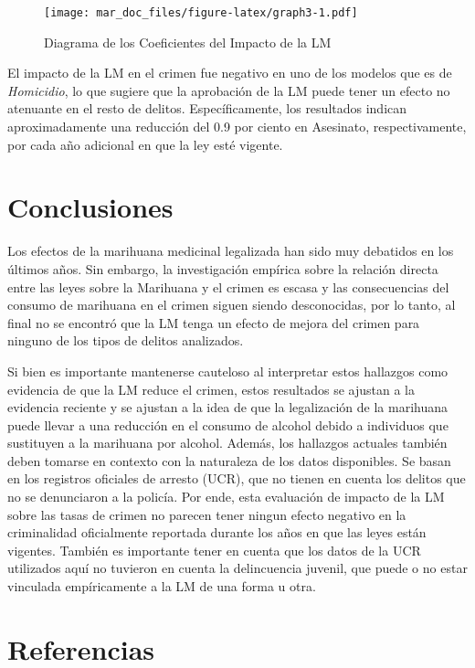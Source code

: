\documentclass[11pt,]{article}
\begin{document}
\begin{figure}
\centering
\texttt{[image: mar\_doc\_files/figure-latex/graph3-1.pdf]}
\caption{\label{fig:plot3} Diagrama de los Coeficientes del Impacto de
la LM}
\end{figure}

\newpage

El impacto de la LM en el crimen fue negativo en uno de los modelos que
es de \emph{Homicidio}, lo que sugiere que la aprobación de la LM puede
tener un efecto no atenuante en el resto de delitos. Específicamente,
los resultados indican aproximadamente una reducción del 0.9 por ciento
en Asesinato, respectivamente, por cada año adicional en que la ley esté
vigente.

\hypertarget{conclusiones}{%
\section{Conclusiones}\label{conclusiones}}

Los efectos de la marihuana medicinal legalizada han sido muy debatidos
en los últimos años. Sin embargo, la investigación empírica sobre la
relación directa entre las leyes sobre la Marihuana y el crimen es
escasa y las consecuencias del consumo de marihuana en el crimen siguen
siendo desconocidas, por lo tanto, al final no se encontró que la LM
tenga un efecto de mejora del crimen para ninguno de los tipos de
delitos analizados.

Si bien es importante mantenerse cauteloso al interpretar estos
hallazgos como evidencia de que la LM reduce el crimen, estos resultados
se ajustan a la evidencia reciente y se ajustan a la idea de que la
legalización de la marihuana puede llevar a una reducción en el consumo
de alcohol debido a individuos que sustituyen a la marihuana por
alcohol. Además, los hallazgos actuales también deben tomarse en
contexto con la naturaleza de los datos disponibles. Se basan en los
registros oficiales de arresto (UCR), que no tienen en cuenta los
delitos que no se denunciaron a la policía. Por ende, esta evaluación de
impacto de la LM sobre las tasas de crimen no parecen tener ningun
efecto negativo en la criminalidad oficialmente reportada durante los
años en que las leyes están vigentes. También es importante tener en
cuenta que los datos de la UCR utilizados aquí no tuvieron en cuenta la
delincuencia juvenil, que puede o no estar vinculada empíricamente a la
LM de una forma u otra.

\newpage

\hypertarget{referencias}{%
\section{Referencias}\label{referencias}}
\end{document}
